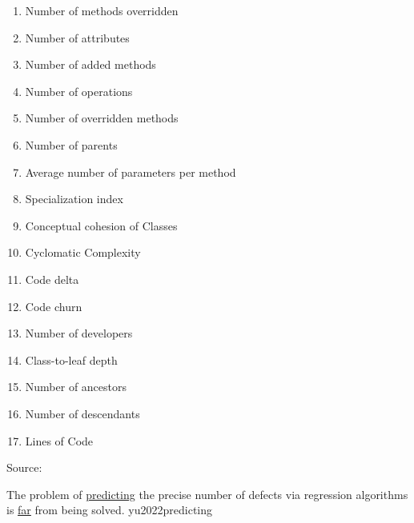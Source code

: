 \documentclass{article}
\begin{document}
{\begin{pptWide}{5}
\begin{enumerate}
\item \textbf{} Number of methods overridden
\item \textbf{} Number of attributes
\item \textbf{} Number of added methods
\item \textbf{} Number of operations
\item \textbf{} Number of overridden methods
\item \textbf{} Number of parents
\item \textbf{} Average number of parameters per method
\item \textbf{} Specialization index
\item \textbf{} Conceptual cohesion of Classes
\item \textbf{} Cyclomatic Complexity
\item \textbf{} Code delta
\item \textbf{} Code churn
\item \textbf{} Number of developers
\item \textbf{} Class-to-leaf depth
\item \textbf{} Number of ancestors
\item \textbf{} Number of descendants
\item \textbf{} Lines of Code
\end{enumerate}
\end{pptWide}
\par
{\scriptsize Source: \par}}

  {The problem of \ul{predicting} the precise number of defects via regression algorithms is \ul{far} from being solved.}
  {yu2022predicting}
\end{document}
